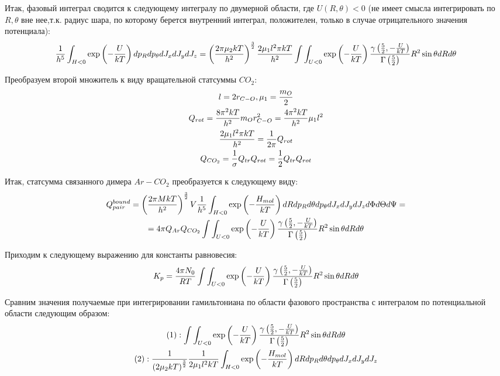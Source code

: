 \documentclass[14pt]{article}
\newcommand{\lb}{\left(}
\newcommand{\rb}{\right)}
\begin{document}
Итак, фазовый интеграл сводится к следующему интегралу по двумерной области, где $U(R, \theta) < 0$ (не имеет смысла интегрировать по $R, \theta$ вне нее,т.к. радиус шара, по которому берется внутренний интеграл, положителен, только в случае отрицательного значения потенциала):
\begin{gather}
	\frac{1}{h^5} \int_{H < 0} \exp \lb -\frac{U}{kT} \rb dp_R dp_\theta dJ_x dJ_y dJ_z = \lb \frac{2 \pi \mu_2 k T}{h^2} \rb^{\frac{3}{2}} \frac{2 \mu_1 l^2 \pi k T}{h^2} \int \int_{U < 0} \exp \lb -\frac{U}{kT}\rb \frac{\gamma \lb \frac{5}{2}, - \frac{U}{kT} \rb}{\Gamma \lb \frac{5}{2} \rb} R^2 \sin \theta dR d\theta \notag 
\end{gather}

Преобразуем второй множитель к виду вращательной статсуммы $CO_2$:
\begin{gather}
	l = 2 r_{C-O}, \mu_1 = \frac{m_O}{2} \notag \\
	Q_{rot} = \frac{8 \pi^2 k T}{h^2} m_O r_{C-O}^2 = \frac{4 \pi^2 k T}{h^2} \mu_1 l^2 \notag \\
	\frac{2 \mu_1 l^2 \pi k T}{h^2} =  \frac{1}{2 \pi} Q_{rot} \notag \\
	Q_{CO_2} = \frac{1}{\sigma} Q_{tr} Q_{rot} = \frac{1}{2} Q_{tr} Q_{rot} \notag
\end{gather}

Итак, статсумма связанного димера $Ar-CO_2$ преобразуется к следующему виду:
\begin{gather}
	Q^{bound}_{pair} = \lb \frac{2 \pi M k T}{h^2} \rb^\frac{3}{2} V \frac{1}{h^5} \int_{H < 0} \exp \lb - \frac{H_{mol}}{kT} \rb dR dp_R d\theta dp_\theta dJ_x dJ_y dJ_z d \Phi d\Theta d\Psi = \notag \\ 
	= 4 \pi Q_{Ar} Q_{CO_2} \int \int_{U < 0} \exp \lb -\frac{U}{kT}\rb \frac{\gamma \lb \frac{5}{2}, - \frac{U}{kT} \rb}{\Gamma \lb \frac{5}{2} \rb} R^2 \sin \theta dR d\theta \notag
\end{gather}

Приходим к следующему выражению для константы равновесия:
\begin{gather}
	K_p = \frac{4 \pi N_0}{R T} \int \int_{U < 0} \exp \lb -\frac{U}{kT}\rb \frac{\gamma \lb \frac{5}{2}, - \frac{U}{kT} \rb}{\Gamma \lb \frac{5}{2} \rb} R^2 \sin \theta dR d\theta \notag 
\end{gather}

\newpage

Сравним значения получаемые при интегрировании гамильтониана по области фазового пространства с интегралом по потенциальной области следующим образом:
\begin{gather}
	(1): \int \int_{U < 0} \exp \lb -\frac{U}{kT} \rb \frac{\gamma \lb \frac{5}{2}, -\frac{U}{kT} \rb}{\Gamma \lb \frac{5}{2} \rb } R^2 \sin \theta dR d \theta \notag \\
	(2): \frac{1}{\lb 2 \mu_2 kT \rb^{\frac{3}{2}}} \frac{1}{2 \mu_1 l^2 kT} \int_{H < 0} \exp \lb - \frac{H_{mol}}{kT} \rb dR dp_R d\theta dp_\theta dJ_x dJ_y dJ_z \notag
\end{gather}
\end{document}
